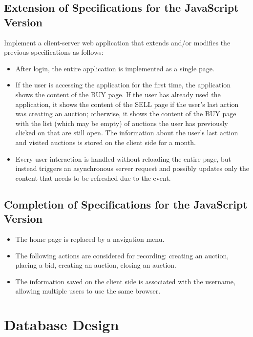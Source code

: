 \documentclass[12pt, a4paper, renqo, final]{amsart}
\let\stdsection\section
\renewcommand{\section}{\newpage\stdsection}
\begin{document}
	\subsection[RIA - Extension of Specifications]{Extension of Specifications for the JavaScript Version}
	Implement a client-server web application that extends and/or modifies the previous specifications as follows:
	\begin{itemize}
		\item After login, the entire application is implemented as a single page.
		\item If the user is accessing the application for the first time, the application shows the content of the BUY page. If the user has already used the application, it shows the content of the SELL page if the user's last action was creating an auction; otherwise, it shows the content of the BUY page with the list (which may be empty) of auctions the user has previously clicked on that are still open. The information about the user's last action and visited auctions is stored on the client side for a month.
		\item Every user interaction is handled without reloading the entire page, but instead triggers an asynchronous server request and possibly updates only the content that needs to be refreshed due to the event.
	\end{itemize}

	\subsection[RIA - Completion of Specifications]{Completion of Specifications for the JavaScript Version}
	\begin{itemize}
		\item The home page is replaced by a navigation menu.
		\item The following actions are considered for recording: creating an auction, placing a bid, creating an auction, closing an auction.
		\item The information saved on the client side is associated with the username, allowing multiple users to use the same browser.
	\end{itemize}


	\section{Database Design}
\end{document}
